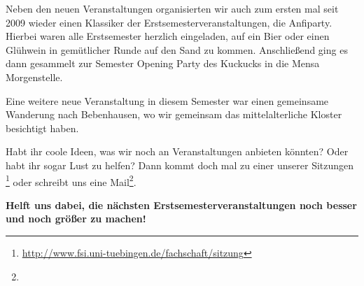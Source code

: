 Neben den neuen Veranstaltungen organisierten wir auch zum ersten mal seit 2009 wieder einen Klassiker der Erstsemesterveranstaltungen, die Anfiparty. Hierbei waren alle Erstsemester herzlich eingeladen, auf ein Bier oder einen Glühwein in gemütlicher Runde auf den Sand zu kommen. Anschließend ging es dann gesammelt zur Semester Opening Party des Kuckucks in die Mensa Morgenstelle.

Eine weitere neue Veranstaltung in diesem Semester war einen gemeinsame Wanderung nach Bebenhausen, wo wir gemeinsam das mittelalterliche Kloster besichtigt haben.


Habt ihr coole Ideen, was wir noch an Veranstaltungen anbieten könnten? Oder habt ihr sogar Lust zu helfen? Dann kommt doch mal zu einer unserer Sitzungen \footnote{\url{http://www.fsi.uni-tuebingen.de/fachschaft/sitzung}} oder schreibt uns eine Mail\footnote{}.

\textbf{Helft uns dabei, die nächsten Erstsemesterveranstaltungen noch besser und noch größer zu machen!}